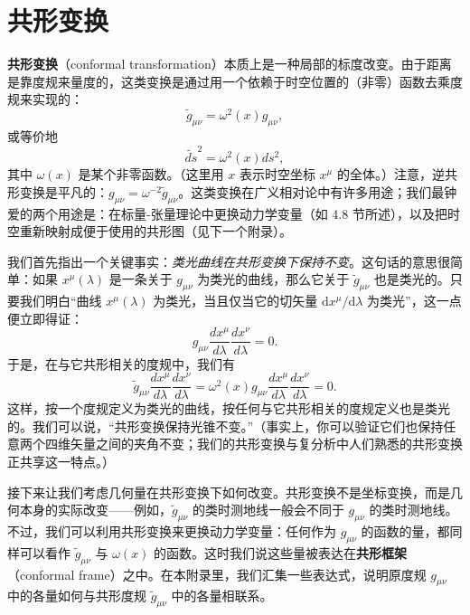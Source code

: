 

\chapter{共形变换}

\textbf{共形变换}（conformal transformation）本质上是一种局部的标度改变。由于距离是靠度规来量度的，这类变换是通过用一个依赖于时空位置的（非零）函数去乘度规来实现的：
\begin{equation*}
\tilde{g}_{\mu\nu} = \omega^{2}(x) g_{\mu\nu},
\tag{G.1}
\end{equation*}
或等价地
\begin{equation*}
\widetilde{ds}^{2} = \omega^{2}(x) ds^{2},
\tag{G.2}
\end{equation*}
其中 $\omega(x)$ 是某个非零函数。（这里用 $x$ 表示时空坐标 $x^{\mu}$ 的全体。）注意，逆共形变换是平凡的：$g_{\mu\nu} = \omega^{-2}\tilde{g}_{\mu\nu}$。这类变换在广义相对论中有许多用途；我们最钟爱的两个用途是：在标量-张量理论中更换动力学变量（如 4.8 节所述），以及把时空重新映射成便于使用的共形图（见下一个附录）。

我们首先指出一个关键事实：\emph{类光曲线在共形变换下保持不变}。这句话的意思很简单：如果 $x^{\mu}(\lambda)$ 是一条关于 $g_{\mu\nu}$ 为类光的曲线，那么它关于 $\tilde{g}_{\mu\nu}$ 也是类光的。只要我们明白“曲线 $x^{\mu}(\lambda)$ 为类光，当且仅当它的切矢量 $\mathrm{d}x^{\mu}/\mathrm{d}\lambda$ 为类光”，这一点便立即得证：
\begin{equation*}
g_{\mu\nu}\frac{dx^{\mu}}{d\lambda}\frac{dx^{\nu}}{d\lambda} = 0.
\tag{G.3}
\end{equation*}
于是，在与它共形相关的度规中，我们有
\begin{equation*}
\tilde{g}_{\mu\nu}\frac{dx^{\mu}}{d\lambda}\frac{dx^{\nu}}{d\lambda}
= \omega^{2}(x) g_{\mu\nu}\frac{dx^{\mu}}{d\lambda}\frac{dx^{\nu}}{d\lambda} = 0.
\tag{G.4}
\end{equation*}
这样，按一个度规定义为类光的曲线，按任何与它共形相关的度规定义也是类光的。我们可以说，“共形变换保持光锥不变。”（事实上，你可以验证它们也保持任意两个四维矢量之间的夹角不变；我们的共形变换与复分析中人们熟悉的共形变换正共享这一特点。）

接下来让我们考虑几何量在共形变换下如何改变。共形变换不是坐标变换，而是几何本身的实际改变——例如，$\tilde{g}_{\mu\nu}$ 的类时测地线一般会不同于 $g_{\mu\nu}$ 的类时测地线。不过，我们可以利用共形变换来更换动力学变量：任何作为 $g_{\mu\nu}$ 的函数的量，都同样可以看作 $\tilde{g}_{\mu\nu}$ 与 $\omega(x)$ 的函数。这时我们说这些量被表达在\textbf{共形框架}（conformal frame）之中。在本附录里，我们汇集一些表达式，说明原度规 $g_{\mu\nu}$ 中的各量如何与共形度规 $\tilde{g}_{\mu\nu}$ 中的各量相联系。

